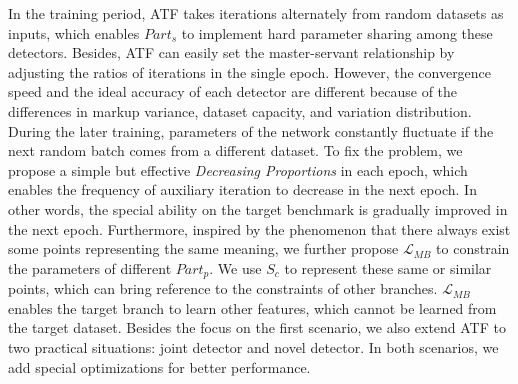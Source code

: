 \documentclass[journal,transmag]{IEEEtran}
\begin{document}
In the training period, ATF takes iterations alternately from random datasets as inputs, which enables $Part_s$ to implement hard parameter sharing among these detectors.
Besides, ATF can easily set the master-servant relationship by adjusting the ratios of iterations in the single epoch.
However, the convergence speed and the ideal accuracy of each detector are different because of the differences in markup variance, dataset capacity, and variation distribution.
During the later training, parameters of the network constantly fluctuate if the next random batch comes from a different dataset.
To fix the problem, we propose a simple but effective \emph{Decreasing Proportions} in each epoch, which enables the frequency of auxiliary iteration to decrease in the next epoch.
In other words, the special ability on the target benchmark is gradually improved in the next epoch.
Furthermore, inspired by the phenomenon that there always exist some points representing the same meaning, we further propose $\mathcal{L}_{MB}$ to constrain the parameters of different $Part_p$.
We use $S_c$ to represent these same or similar points, which can bring reference to the constraints of other branches.
$\mathcal{L}_{MB}$ enables the target branch to learn other features, which cannot be learned from the target dataset.
Besides the focus on the first scenario, we also extend ATF to two practical situations: joint detector and novel detector.
In both scenarios, we add special optimizations for better performance.
\end{document}
